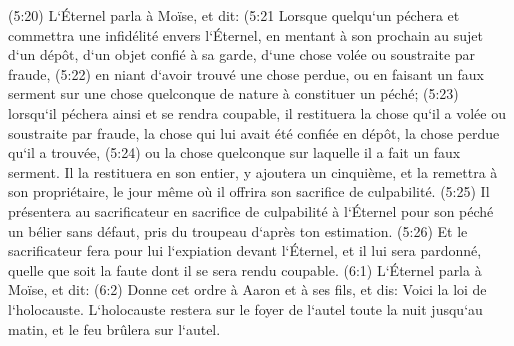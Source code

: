 \verse (5:20) L`Éternel parla à Moïse, et dit: 
\verse (5:21 Lorsque quelqu`un péchera et commettra une infidélité envers l`Éternel, en mentant à son prochain au sujet d`un dépôt, d`un objet confié à sa garde, d`une chose volée ou soustraite par fraude, 
\verse (5:22) en niant d`avoir trouvé une chose perdue, ou en faisant un faux serment sur une chose quelconque de nature à constituer un péché; 
\verse (5:23) lorsqu`il péchera ainsi et se rendra coupable, il restituera la chose qu`il a volée ou soustraite par fraude, la chose qui lui avait été confiée en dépôt, la chose perdue qu`il a trouvée, 
\verse (5:24) ou la chose quelconque sur laquelle il a fait un faux serment. Il la restituera en son entier, y ajoutera un cinquième, et la remettra à son propriétaire, le jour même où il offrira son sacrifice de culpabilité. 
\verse (5:25) Il présentera au sacrificateur en sacrifice de culpabilité à l`Éternel pour son péché un bélier sans défaut, pris du troupeau d`après ton estimation. 
\verse (5:26) Et le sacrificateur fera pour lui l`expiation devant l`Éternel, et il lui sera pardonné, quelle que soit la faute dont il se sera rendu coupable. 
\verse (6:1) L`Éternel parla à Moïse, et dit: 
\verse (6:2) Donne cet ordre à Aaron et à ses fils, et dis: Voici la loi de l`holocauste. L`holocauste restera sur le foyer de l`autel toute la nuit jusqu`au matin, et le feu brûlera sur l`autel. 

